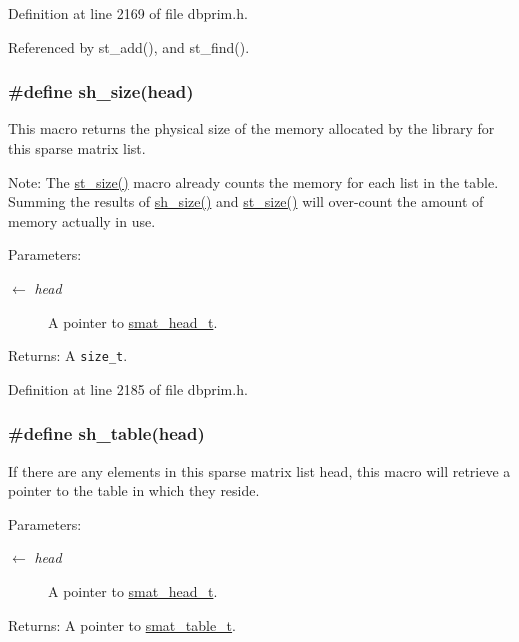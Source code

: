 Definition at line 2169 of file dbprim.h.

Referenced by st\_\-add(), and st\_\-find().\hypertarget{group__dbprim__smat_ga53}{
\subsubsection[sh\_\-size]{\setlength{\rightskip}{0pt plus 5cm}\#define sh\_\-size(head)}}
\label{group__dbprim__smat_ga53}


This macro returns the physical size of the memory allocated by the library for this sparse matrix list.

\begin{Desc}
\item[Note:]The \hyperlink{group__dbprim__smat_ga40}{st\_\-size()} macro already counts the memory for each list in the table. Summing the results of \hyperlink{group__dbprim__smat_ga53}{sh\_\-size()} and \hyperlink{group__dbprim__smat_ga40}{st\_\-size()} will over-count the amount of memory actually in use.\end{Desc}
\begin{Desc}
\item[Parameters:]
\begin{description}
\item[\mbox{$\leftarrow$} {\em head}]A pointer to \hyperlink{group__dbprim__smat_ga1}{smat\_\-head\_\-t}.\end{description}
\end{Desc}
\begin{Desc}
\item[Returns:]A {\tt size\_\-t}.\end{Desc}


Definition at line 2185 of file dbprim.h.\hypertarget{group__dbprim__smat_ga45}{
\subsubsection[sh\_\-table]{\setlength{\rightskip}{0pt plus 5cm}\#define sh\_\-table(head)}}
\label{group__dbprim__smat_ga45}


If there are any elements in this sparse matrix list head, this macro will retrieve a pointer to the table in which they reside.

\begin{Desc}
\item[Parameters:]
\begin{description}
\item[\mbox{$\leftarrow$} {\em head}]A pointer to \hyperlink{group__dbprim__smat_ga1}{smat\_\-head\_\-t}.\end{description}
\end{Desc}
\begin{Desc}
\item[Returns:]A pointer to \hyperlink{group__dbprim__smat_ga0}{smat\_\-table\_\-t}.\end{Desc}


